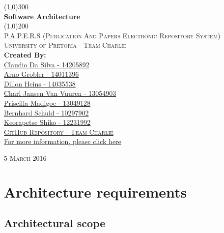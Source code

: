 \documentclass{article}
\begin{document}
	
	\begin{titlepage}
		\begin{center}
			
			\line(1,0){300}\\
			[6mm]
			\huge{
				\bfseries Software Architecture
			}\\
			[2mm]
			\line(1,0){200}\\
			[15mm]
			\textsc{\large P.A.P.E.R.S (Publication And Papers Electronic Repository System)}\\
			[7.5mm]
			\textsc{\large University of Pretoria - Team Charlie}\\
			[20mm]
			\large{\textbf{Created By:}}\\
			[2mm]
			\large{
				\href{https://github.com/ClaudioMDS}{Claudio Da Silva - 14205892}\\
				\href{https://github.com/ArnoGrobler}{Arno Grobler - 14011396}\\
				\href{https://github.com/DillonHeins}{Dillon Heins - 14035538}\\
				\href{https://github.com/u13054903}{Charl Jansen Van Vuuren - 13054903}\\
				\href{https://github.com/pris264}{Priscilla Madigoe - 13049128}\\
				\href{https://github.com/BSchuld}{Bernhard Schuld - 10297902}\\
				\href{https://github.com/Keo11}{Keorapetse Shiko - 12231992}
			}\\
			[4cm]
			
			\href{https://github.com/DillonHeins/Charlie}{\textsc{\Large GitHub Repository - Team Charlie}\\[2mm]
				For more information, please click here}
			
		\end{center}	
		\begin{flushright}
			\textsc{\large 5 March 2016}
		\end{flushright}
	\end{titlepage}
	
	\cleardoublepage
	\thispagestyle{empty}
	\tableofcontents
	\cleardoublepage
	\listoffigures
	\cleardoublepage
	\setcounter{page}{1}
	\section{Architecture requirements}\label{sec:requirements}
	
	\subsection{Architectural scope}\label{subsec:scope}
\end{document}

